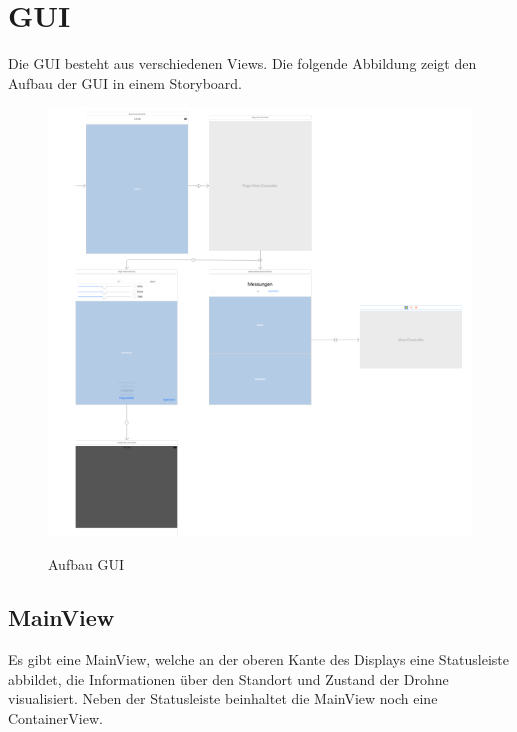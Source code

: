 \section{\acf{GUI}}
Die \acs{GUI} besteht aus verschiedenen Views. Die folgende Abbildung zeigt den Aufbau der \acs{GUI} in einem Storyboard. 
\newline
\begin{figure}[H]
	\begin{center}
		{\includegraphics[width=1\textwidth]{images/AufbauGUI.png}}
		\caption{Aufbau \acs{GUI}}
	\end{center}
\end{figure}
\subsection{MainView}
Es gibt eine MainView, welche an der oberen Kante des Displays eine Statusleiste abbildet, die Informationen über den Standort und Zustand der Drohne visualisiert. Neben der Statusleiste beinhaltet die MainView noch eine ContainerView. 
